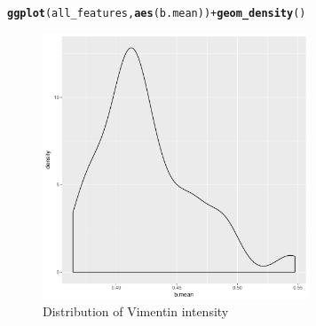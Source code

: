 \documentclass{article}\usepackage[]{graphicx}\usepackage[]{color}
\makeatletter
\newcommand{\hlopt}[1]{\textcolor[rgb]{0,0,0}{#1}}%
\newcommand{\hlstd}[1]{\textcolor[rgb]{0.345,0.345,0.345}{#1}}%
\newcommand{\hlkwd}[1]{\textcolor[rgb]{0.737,0.353,0.396}{\textbf{#1}}}%
\newenvironment{kframe}{%
 \def\at@end@of@kframe{}%
 \ifinner\ifhmode%
  \def\at@end@of@kframe{\end{minipage}}%
  \begin{minipage}{\columnwidth}%
 \fi\fi%
 \def\FrameCommand##1{\hskip\@totalleftmargin \hskip-\fboxsep
 \colorbox{shadecolor}{##1}\hskip-\fboxsep
     \hskip-\linewidth \hskip-\@totalleftmargin \hskip\columnwidth}%
 \MakeFramed {\advance\hsize-\width
   \@totalleftmargin\z@ \linewidth\hsize
   \@setminipage}}%
 {\par\unskip\endMakeFramed%
 \at@end@of@kframe}
\newenvironment{knitrout}{}{} %
\makeatother
\begin{document}
\begin{knitrout}
\color{fgcolor}\begin{kframe}
\begin{alltt}
\hlkwd{ggplot}\hlstd{(all_features,} \hlkwd{aes}\hlstd{(b.mean))} \hlopt{+} \hlkwd{geom_density}\hlstd{()}
\end{alltt}
\end{kframe}\begin{figure}

{\centering \includegraphics[width=300px]{knit_figure/figintens-1} 

}

\caption[Distribution of Vimentin intensity]{Distribution of Vimentin intensity}\label{fig:intens}
\end{figure}


\end{knitrout}
\end{document}
